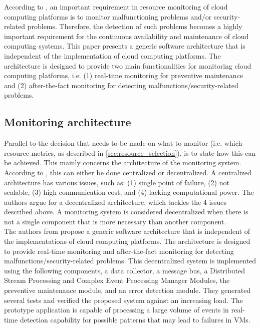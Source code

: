 \noindent
According to \cite{aktas2018hybrid}, an important requirement in resource monitoring of cloud computing platforms is to monitor malfunctioning problems and/or security-related problems. Therefore, the detection of such problems becomes a highly important requirement for the continuous availability and maintenance of cloud computing systems. This paper presents a generic software architecture that is independent of the implementation of cloud computing platforms. The architecture is designed to provide two main functionalities for monitoring cloud computing platforms, i.e. (1) real-time monitoring for preventive maintenance and (2) after-the-fact monitoring for detecting malfunctions/security-related problems.\\

\subsection{Monitoring architecture} \label{sec:monitoring_architecture}
Parallel to the decision that needs to be made on what to monitor (i.e. which resource metrics, as described in \autoref{sec:resource_selection}), is to state how this can be achieved. This mainly concerns the architecture of the monitoring system. According to \cite{kumar2017inspection}, this can either be done centralized or decentralized. A centralized architecture has various issues, such as: (1) single point of failure, (2) not scalable, (3) high communication cost, and (4) lacking computational power. The authors argue for a decentralized architecture, which tackles the 4 issues described above. A monitoring system is considered decentralized when there is not a single component that is more necessary than another component.\\

\noindent
The authors from \cite{aktas2018hybrid} propose a generic software architecture that is independent of the implementations of cloud computing platforms. The architecture is designed to provide real-time monitoring and after-the-fact monitoring for detecting malfunctions/security-related problems. This decentralized system is implemented using the following components, a data collector, a message bus, a Distributed Stream Processing and Complex Event Processing Manager Modules, the preventive maintenance module, and an error detection module. They generated several tests and verified the proposed system against an increasing load. The prototype application is capable of processing a large volume of events in real-time detection capability for possible patterns that may lead to failures in VMs.\\

